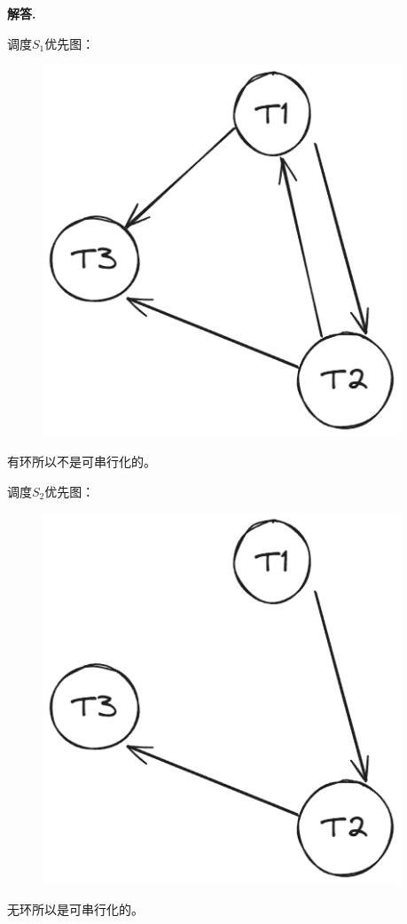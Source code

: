 \documentclass[12pt, a4paper, oneside]{ctexart}
\newenvironment{solution}{\par\noindent\textbf{解答. }}{\par}
\begin{document}
\begin{solution}

    调度$S_1$优先图：

    \begin{figure}[H]
        \centering
        \includegraphics[width=0.95\textwidth]{figures/3.png}
    \end{figure}

    有环所以不是可串行化的。

    调度$S_2$优先图：

    \begin{figure}[H]
        \centering
        \includegraphics[width=0.95\textwidth]{figures/4.png}
    \end{figure}

    无环所以是可串行化的。



\end{solution}
\end{document}
